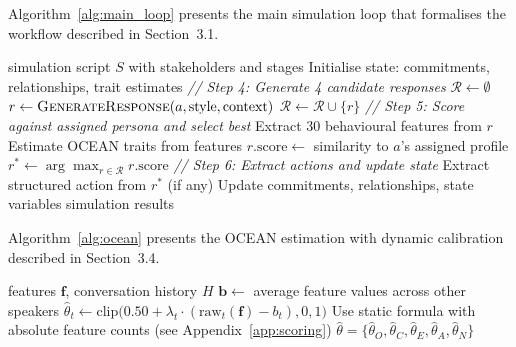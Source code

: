 \documentclass[12pt, a4paper]{report}
\begin{document}
Algorithm~\ref{alg:main_loop} presents the main simulation loop that formalises the workflow described in Section~3.1.

\begin{algorithm}[ht]
\caption{Main Simulation Loop}
\label{alg:main_loop}
\begin{algorithmic}[1]
\Require simulation script $S$ with stakeholders and stages
\State Initialise state: commitments, relationships, trait estimates
        \State \textit{// Step 4: Generate 4 candidate responses}
        \State $\mathcal{R} \gets \emptyset$
            \State $r \gets \textsc{GenerateResponse}(a, \text{style}, \text{context})$ 
            \State $\mathcal{R} \gets \mathcal{R} \cup \{r\}$
        \EndFor
        \State \textit{// Step 5: Score against assigned persona and select best}
            \State Extract 30 behavioural features from $r$
            \State Estimate OCEAN traits from features
            \State $r.\text{score} \gets$ similarity to $a$'s assigned profile
        \EndFor
        \State $r^* \gets \arg\max_{r \in \mathcal{R}} r.\text{score}$
        \State \textit{// Step 6: Extract actions and update state}
        \State Extract structured action from $r^*$ (if any)
        \State Update commitments, relationships, state variables
    \EndFor
\EndFor
\State \Return simulation results
\end{algorithmic}
\end{algorithm}

Algorithm~\ref{alg:ocean} presents the OCEAN estimation with dynamic calibration described in Section~3.4.

\begin{algorithm}[ht]
\caption{OCEAN Estimation with Dynamic Calibration}
\label{alg:ocean}
\begin{algorithmic}[1]
\Require features $\mathbf{f}$, conversation history $H$
    \State $\mathbf{b} \gets$ average feature values across other speakers
        \State $\hat{\theta}_t \gets \text{clip}\big(0.50 + \lambda_t \cdot (\text{raw}_t(\mathbf{f}) - b_t), 0, 1\big)$
    \EndFor
\Else
    \State Use static formula with absolute feature counts (see Appendix~\ref{app:scoring})
\EndIf
\State \Return $\hat{\theta} = \{\hat{\theta}_O, \hat{\theta}_C, \hat{\theta}_E, \hat{\theta}_A, \hat{\theta}_N\}$
\end{algorithmic}
\end{algorithm}
\end{document}
